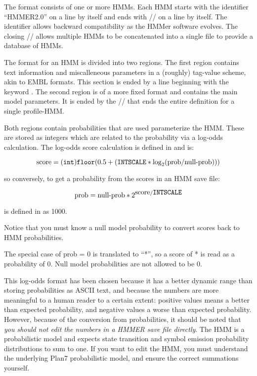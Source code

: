 The format consists of one or more HMMs. Each HMM starts with the
identifier ``HMMER2.0'' on a line by itself and ends with // on a line
by itself. The identifier allows backward compatibility as the HMMer
software evolves. The closing // allows multiple HMMs to be
concatenated into a single file to provide a database of HMMs.

The format for an HMM is divided into two regions. The first region
contains text information and miscalleneous parameters in a (roughly)
tag-value scheme, akin to EMBL formats. This section is ended by a
line beginning with the keyword . The second region is of a
more fixed format and contains the main model parameters. It is ended
by the // that ends the entire definition for a single profile-HMM.

Both regions contain probabilities that are used parameterize the HMM.
These are stored as integers which are related to the probability via
a log-odds calculation. The log-odds score calculation is defined in
 and is:

\[
\mbox{score} = (\mbox{\texttt{int}}) \mbox{\texttt{floor}}(0.5 + (\mbox{\texttt{INTSCALE}} * \log_2(\mbox{prob}/\mbox{null-prob})))
\]

so conversely, to get a probability from the scores in an HMM save
file:

\[
\mbox{prob} = \mbox{null-prob} * 2^{\mbox{score}/\mbox{\texttt{INTSCALE}}}
\]

 is defined in  as 1000. 

Notice that you must know a null model probability to convert scores
back to HMM probabilities. 

The special case of prob = 0 is translated to ``*'', so a score of *
is read as a probability of 0. Null model probabilities are not
allowed to be 0.

This log-odds format has been chosen because it has a better dynamic
range than storing probabilities as ASCII text, and because the
numbers are more meaningful to a human reader to a certain extent:
positive values means a better than expected probability, and negative
values a worse than expected probability.  However, because of the
conversion from probabilities, it should be noted that {\em you should
not edit the numbers in a HMMER save file directly}. The HMM is a
probabilistic model and expects state transition and symbol emission
probability distributions to sum to one. If you want to edit the HMM,
you must understand the underlying Plan7 probabilistic model, and
ensure the correct summations yourself.

